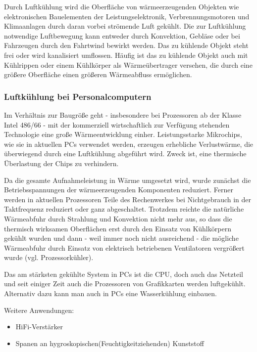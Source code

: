 Durch Luftkühlung wird die Oberfläche von wärmeerzeugenden Objekten wie elektronischen Bauelementen der Leistungselektronik, Verbrennungsmotoren und Klimaanlagen durch daran vorbei strömende Luft gekühlt.
Die zur Luftkühlung notwendige Luftbewegung kann entweder durch Konvektion, Gebläse oder bei Fahrzeugen durch den Fahrtwind bewirkt werden. Das zu kühlende Objekt steht frei oder wird kanalisiert umflossen. Häufig ist das zu kühlende Objekt auch mit Kühlrippen oder einem Kühlkörper als Wärmeübertrager versehen, die durch eine größere Oberfläche einen größeren Wärmeabfluss ermöglichen.

\subsubsection{Luftkühlung bei Personalcomputern}

Im Verhältnis zur Baugröße geht - insbesondere bei Prozessoren ab der Klasse Intel 486/66 - mit der kommerziell wirtschaftlich zur Verfügung stehenden Technologie eine große Wärmeentwicklung einher. Leistungsstarke Mikrochips, wie sie in aktuellen PCs verwendet werden, erzeugen erhebliche Verlustwärme, die überwiegend durch eine Luftkühlung abgeführt wird. Zweck ist, eine thermische Überlastung der Chips zu verhindern.

Da die gesamte Aufnahmeleistung in Wärme umgesetzt wird, wurde zunächst die Betriebsspannungen der wärmeerzeugenden Komponenten reduziert. Ferner werden in aktuellen Prozessoren Teile des Rechenwerkes bei Nichtgebrauch in der Taktfrequenz reduziert oder ganz abgeschaltet. Trotzdem reichte die natürliche Wärmeabfuhr durch Strahlung und Konvektion nicht mehr aus, so dass die thermisch wirksamen Oberflächen erst durch den Einsatz von Kühlkörpern gekühlt wurden und dann - weil immer noch nicht ausreichend - die mögliche Wärmeabfuhr durch Einsatz von elektrisch betriebenen Ventilatoren vergrößert wurde (vgl. Prozessorkühler). 

Das am stärksten gekühlte System in PCs ist die CPU, doch auch das Netzteil und seit einiger Zeit auch die Prozessoren von Grafikkarten werden luftgekühlt. Alternativ dazu kann man auch in PCs eine Wasserkühlung einbauen.

Weitere Anwendungen:
\begin{itemize}
	\item HiFi-Verstärker 
	\item Spanen an hygroskopischen(Feuchtigkeitziehenden) Kunststoff
\end{itemize}

